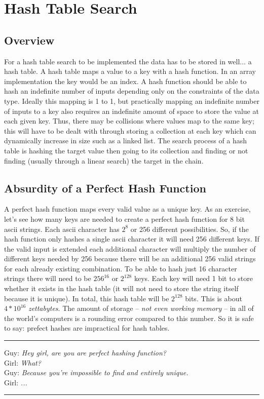 \documentclass[letterpaper, 10pt]{article}
\begin{document}
\section{Hash Table Search}
\subsection{Overview}
For a hash table search to be implemented the data has to be stored in well... a hash table. A hash table maps
a value to a key with a hash function. In an array implementation the key would be an index. A hash function
should be able to hash an indefinite number of inputs depending only on the constraints of the data type. 
Ideally this mapping is 1 to 1, but practically mapping an indefinite number of inputs to a key also requires
an indefinite amount of space to store the value at each given key. Thus, there may be collisions
where values map to the same key; this will have to be dealt with through storing a collection at each key
which can dynamically increase in size such as a linked list. The search process of a hash table is
hashing the target value then going to its collection and finding or not finding (usually through a linear search)
the target in the chain.
\subsection{Absurdity of a Perfect Hash Function}
A perfect hash function maps every valid value as a unique key. As an exercise, let's see how many keys
are needed to create a perfect hash function for 8 bit ascii strings. Each ascii character
has $2^8$ or 256 different possibilities. So, if the hash function only hashes
a single ascii character it will need 256 different keys. If the valid input is extended each
additional character will multiply the number of different keys needed by 256 because there will be an
additional 256 valid strings for each already existing combination. To be able to hash just 16 character
strings there will need to be $256^{16}$ or $2^{128}$ keys. Each key will need 1 bit
to store whether it exists in
the hash table (it will not need to store the string itself because it is unique).
In total, this hash table will be $2^{128}$ bits. This is about $4*10^{16}$ \textit{zettabytes}. The amount
of storage -- \textit{not even working memory} -- in all of the world's computers is a rounding error compared to
this number. So it is safe to say: prefect hashes are impractical for hash tables.
\vspace{.25cm}
\hrule
\vspace{.25cm}
\noindent
Guy: \textit{Hey girl, are you are perfect hashing function?}\\
Girl: \textit{What?}\\
Guy: \textit{Because you're impossible to find and entirely unique.}\\
Girl: \textit{...}\\
\hrule
\vspace{1cm}
\newpage
\end{document}
